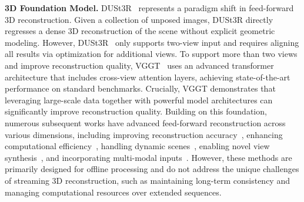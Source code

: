 \noindent\textbf{3D Foundation Model.}
DUSt3R~\cite{dust3r} represents a paradigm shift in feed-forward 3D reconstruction.
Given a collection of unposed images, DUSt3R directly regresses a dense 3D reconstruction of the scene without explicit geometric modeling.
However, DUSt3R~\cite{dust3r} only supports two-view input and requires aligning all results via optimization for additional views.
To support more than two views and improve reconstruction quality, VGGT~\cite{wang2025vggt} uses an advanced transformer architecture that includes cross-view attention layers, achieving state-of-the-art performance on standard benchmarks.
Crucially, VGGT demonstrates that leveraging large-scale data together with powerful model architectures can significantly improve reconstruction quality.
Building on this foundation, numerous subsequent works have advanced feed-forward reconstruction across various dimensions, including improving reconstruction accuracy~\cite{wang2025vggt, zhang2025flare, wang2025pi, depthanything3}, enhancing computational efficiency~\cite{yang2025fast3r, liu2025slam3r}, handling dynamic scenes~\cite{zhang2024monst3r, sucar2025dynamic, chen2025easi3r, feng2025st4rtrack, xiao2025spatialtracker, lu2025align3r, jin2025stereo4d, wang2025spatialvid}, enabling novel view synthesis~\cite{lin2025longsplat, ye2024no, jiang2025anysplat, chen2025long3r, smart2024splatt3r, xu2024grm, hong2024lrm, tang2024lgm, xu2024dmv3d, li2024instant3d, wang2024pflrm}, and incorporating multi-modal inputs~\cite{lu2025matrix3d, jang2025pow3r, keetha2025mapanything}.
However, these methods are primarily designed for offline processing and do not address the unique challenges of streaming 3D reconstruction, such as maintaining long-term consistency and managing computational resources over extended sequences.

